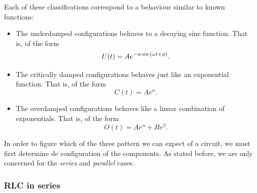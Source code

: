\documentclass[12pt,twoside]{extarticle}
\begin{document}
Each of these classifications correspond to a behaviour similar to known functions:
\begin{itemize}\setlength\itemsep{0.25em}
    \item  The underdamped configurations behaves to a decaying sine function. That is, of the form 
        \begin{equation} U(t)=Ae^{-\alpha  \sin \qty(\omega t + \phi)}.\end{equation}
    \item  The critically damped configurations behaves just like an exponential function. That is, of the form 
        \begin{equation} C(t)=Ae^{\alpha}.\end{equation}
    \item  The overdamped configurations behaves like a linear combination of exponentials. That is, of the form 
        \begin{equation} O(t)=Ae^{\alpha}+Be^{\beta} .\end{equation}
\end{itemize}

In order to figure which of the three pattern we can expect of a circuit, we must first determine de configuration of the components. As stated before, we are only concerned for the \textit{series} and \textit{parallel} cases.
\subsubsection{RLC in series}
\end{document}
